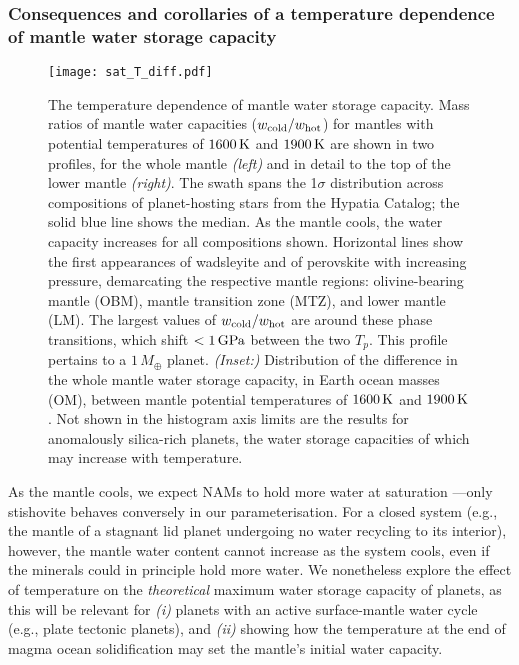 



\subsubsection{Consequences and corollaries of a temperature dependence of mantle water storage capacity}
\label{sec:discussion-temperature}


\begin{figure}
    \centering
    \texttt{[image: sat\_T\_diff.pdf]}
    \caption[The temperature dependence of mantle water storage capacity.]{The temperature dependence of mantle water storage capacity. Mass ratios of mantle water capacities ($w_{\rm cold}/w_{\rm hot}$) for mantles with potential temperatures of $1600\,{\rm K}$ and $1900\,{\rm K}$ are shown in two profiles, for the whole mantle \textit{(left)} and in detail to the top of the lower mantle \textit{(right)}. The swath spans the 1$\sigma$ distribution across compositions of planet-hosting stars from the Hypatia Catalog; the solid blue line shows the median. As the mantle cools, the water capacity increases for all compositions shown. Horizontal lines show the first appearances of wadsleyite and of perovskite with increasing pressure, demarcating the respective mantle regions: olivine-bearing mantle (OBM), mantle transition zone (MTZ), and lower mantle (LM). The largest values of $w_{\rm cold}/w_{\rm hot}$ are around these phase transitions, which shift $<1\,{\rm GPa}$ between the two $T_p$. This profile pertains to a $1\,M_\oplus$ planet. \textit{(Inset:)} Distribution of the difference in the whole mantle water storage capacity, in Earth ocean masses (OM), between mantle potential temperatures of $1600\,{\rm K}$ and $1900\,{\rm K}$. Not shown in the histogram axis limits are the results for anomalously silica-rich planets, the water storage capacities of which may increase with temperature.}
    \label{fig:sat_diff_T}
\end{figure}



As the mantle cools, we expect NAMs to hold more water at saturation \citep{keppler_thermodynamics_2006}---only stishovite behaves conversely in our parameterisation. For a closed system (e.g., the mantle of a stagnant lid planet undergoing no water recycling to its interior), however, the mantle water content cannot increase as the system cools, even if the minerals could in principle hold more water. We nonetheless explore the effect of temperature on the \textit{theoretical} maximum water storage capacity of planets, as this will be relevant for \textit{(i)} planets with an active surface-mantle water cycle (e.g., plate tectonic planets), and \textit{(ii)} showing how the temperature at the end of magma ocean solidification may set the mantle's initial water capacity.

